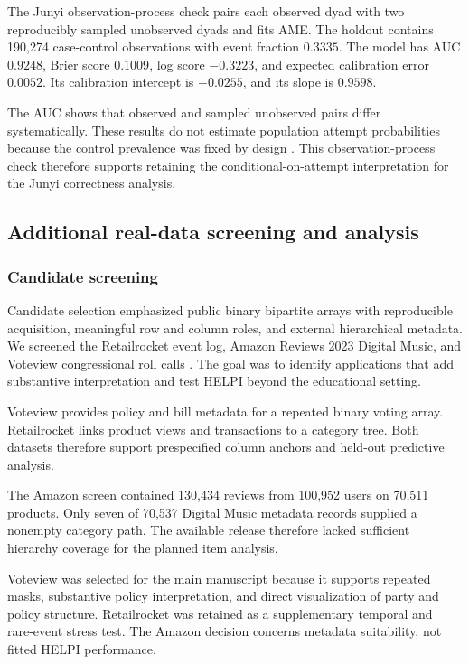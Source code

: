\documentclass[
  12pt]{article}
\theoremstyle{definition}
\theoremstyle{plain}
\begin{document}
The Junyi observation-process check pairs each observed dyad with two reproducibly sampled unobserved dyads and fits AME.
\label{supp:exposure-results}
The holdout contains 190,274 case-control observations with event fraction $0.3335$. The model has AUC $0.9248$, Brier score $0.1009$, log score $-0.3223$, and expected calibration error $0.0052$. Its calibration intercept is $-0.0255$, and its slope is $0.9598$.

The AUC shows that observed and sampled unobserved pairs differ systematically. These results do not estimate population attempt probabilities because the control prevalence was fixed by design \citep{prentice_1979_LogisticDiseaseIncidence}. This observation-process check therefore supports retaining the conditional-on-attempt interpretation for the Junyi correctness analysis.

\subsection{Additional real-data screening and analysis}
\label{supp:additional-realdata}

\subsubsection{Candidate screening}

Candidate selection emphasized public binary bipartite arrays with reproducible acquisition, meaningful row and column roles, and external hierarchical metadata.
We screened the Retailrocket event log, Amazon Reviews 2023 Digital Music, and Voteview congressional roll calls \citep{zykov_2022_RetailrocketRecommenderSystem,hou_2024_BridgingLanguageItems,lewis_2026_VoteviewCongressionalRollCall}.
The goal was to identify applications that add substantive interpretation and test HELPI beyond the educational setting.

Voteview provides policy and bill metadata for a repeated binary voting array.
Retailrocket links product views and transactions to a category tree.
Both datasets therefore support prespecified column anchors and held-out predictive analysis.

The Amazon screen contained 130,434 reviews from 100,952 users on 70,511 products.
Only seven of 70,537 Digital Music metadata records supplied a nonempty category path.
The available release therefore lacked sufficient hierarchy coverage for the planned item analysis.

Voteview was selected for the main manuscript because it supports repeated masks, substantive policy interpretation, and direct visualization of party and policy structure.
Retailrocket was retained as a supplementary temporal and rare-event stress test.
The Amazon decision concerns metadata suitability, not fitted HELPI performance.
\end{document}
